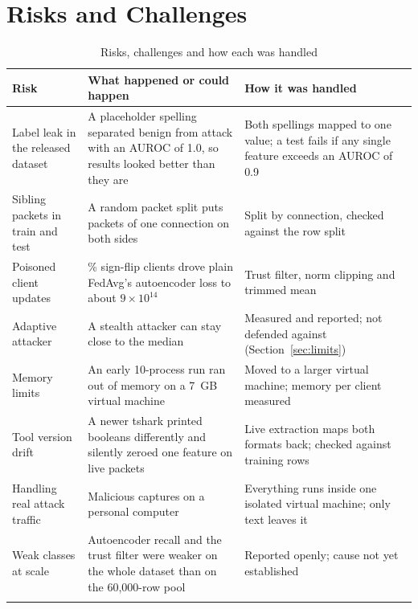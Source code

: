 \section{Risks and Challenges}
\renewcommand{\arraystretch}{1.25}
\begin{longtable}{|>{\raggedright\arraybackslash}p{4.3cm}|>{\raggedright\arraybackslash}p{4.4cm}|>{\raggedright\arraybackslash}p{4.8cm}|}
\hline
\textbf{Risk} & \textbf{What happened or could happen} & \textbf{How it was handled} \\ \hline
\endhead
Label leak in the released dataset & A placeholder spelling separated benign from attack with an AUROC of 1.0, so results looked better than they are & Both spellings mapped to one value; a test fails if any single feature exceeds an AUROC of 0.9 \\ \hline
Sibling packets in train and test & A random packet split puts packets of one connection on both sides & Split by connection, checked against the row split \\ \hline
Poisoned client updates & 30\% sign-flip clients drove plain FedAvg's autoencoder loss to about $9\times10^{14}$ & Trust filter, norm clipping and trimmed mean \\ \hline
Adaptive attacker & A stealth attacker can stay close to the median & Measured and reported; not defended against (Section~\ref{sec:limits}) \\ \hline
Memory limits & An early 10-process run ran out of memory on a 7~GB virtual machine & Moved to a larger virtual machine; memory per client measured \\ \hline
Tool version drift & A newer tshark printed booleans differently and silently zeroed one feature on live packets & Live extraction maps both formats back; checked against training rows \\ \hline
Handling real attack traffic & Malicious captures on a personal computer & Everything runs inside one isolated virtual machine; only text leaves it \\ \hline
Weak classes at scale & Autoencoder recall and the trust filter were weaker on the whole dataset than on the 60{,}000-row pool & Reported openly; cause not yet established \\ \hline
\caption{Risks, challenges and how each was handled}
\end{longtable}
